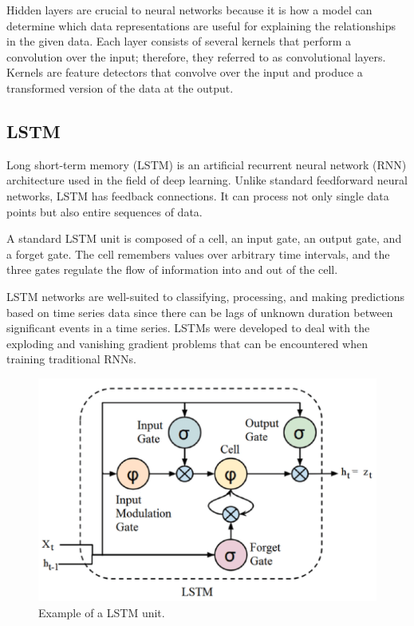 \documentclass{turabian-thesis}
\begin{document}
Hidden layers are crucial to neural networks because it is how a model can determine which data representations are useful for explaining the relationships in the given data. Each layer consists of several kernels that perform a convolution over the input; therefore, they referred to as convolutional layers. Kernels are feature detectors that convolve over the input and produce a transformed version of the data at the output. 




\subsection{LSTM}

Long short-term memory (LSTM) is an artificial recurrent neural network (RNN) architecture used in the field of deep learning. Unlike standard feedforward neural networks, LSTM has feedback connections. It can process not only single data points but also entire sequences of data. 

A standard LSTM unit is composed of a cell, an input gate, an output gate, and a forget gate. The cell remembers values over arbitrary time intervals, and the three gates regulate the flow of information into and out of the cell.

LSTM networks are well-suited to classifying, processing, and making predictions based on time series data since there can be lags of unknown duration between significant events in a time series. LSTMs were developed to deal with the exploding and vanishing gradient problems that can be encountered when training traditional RNNs. 

\begin{figure}[h!]
   \begin{center}
      \includegraphics[scale=0.5]{../media/lstm_highlight.png}
   \end{center}
   \caption{Example of a LSTM unit.}
   \label{fig:reinforcementAgent}
\end{figure}
\end{document}
